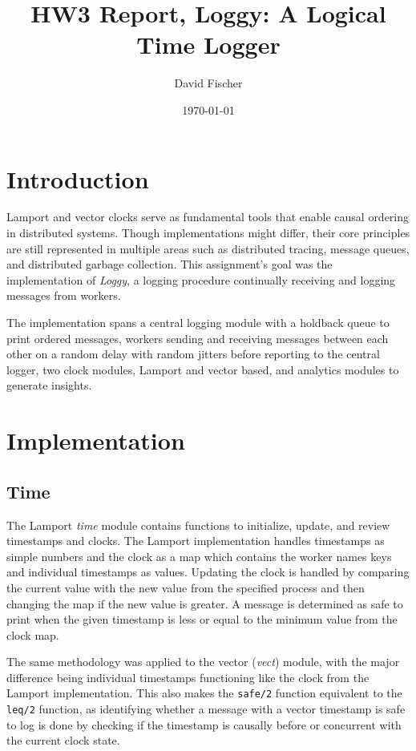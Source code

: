 \documentclass[a4paper, 11pt]{article}
\title{HW3 Report, Loggy: A Logical Time Logger}
\author{David Fischer}
\date{\today{}}
\begin{document}
\maketitle

\section{Introduction}
Lamport and vector clocks serve as fundamental tools that enable causal ordering in distributed systems. Though implementations might differ, their core principles are still represented in multiple areas such as distributed tracing, message queues, and distributed garbage collection.
This assignment's goal was the implementation of \textit{Loggy}, a logging procedure continually receiving and logging messages from workers.

The implementation spans a central logging module with a holdback queue to print ordered messages, workers sending and receiving messages between each other on a random delay with random jitters before reporting to the central logger, two clock modules, Lamport and vector based, and analytics modules to generate insights.

\section{Implementation}

\subsection{Time}

The Lamport \textit{time} module contains functions to initialize, update, and review timestamps and clocks.
The Lamport implementation handles timestamps as simple numbers and the clock as a map which contains the worker names keys and individual timestamps as values.
Updating the clock is handled by comparing the current value with the new value from the specified process and then changing the map if the new value is greater.
A message is determined as safe to print when the given timestamp is less or equal to the minimum value from the clock map.

The same methodology was applied to the vector (\textit{vect}) module, with the major difference being individual timestamps functioning like the clock from the Lamport implementation. This also makes the \texttt{safe/2} function equivalent to the \texttt{leq/2} function, as identifying whether a message with a vector timestamp is safe to log is done by checking if the timestamp is causally before or concurrent with the current clock state.
\end{document}
